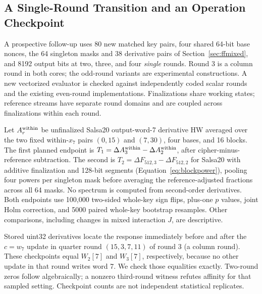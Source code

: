 \subsection{A Single-Round Transition and an Operation Checkpoint}\label{sec:roundtransitionmethods}

A prospective follow-up uses 80 new matched key pairs, four shared 64-bit base nonces, the 64 singleton masks and 38 derivative pairs of Section~\ref{sec:ffmixed}, and 8192 output bits at two, three, and four \emph{single} rounds. Round 3 is a column round in both cores; the odd-round variants are experimental constructions. A new vectorized evaluator is checked against independently coded scalar rounds and the existing even-round implementations. Finalizations share working states; reference streams have separate round domains and are coupled across finalizations within each round.

Let $A^{\rm within}_r$ be unfinalized Salsa20 output-word-7 derivative HW averaged over the two fixed within-$x_7$ pairs $(0,15)$ and $(7,30)$, four bases, and 16 blocks. The first planned endpoint is $T_1=\Delta A^{\rm within}_3-\Delta A^{\rm within}_2$, after cipher-minus-reference subtraction. The second is $T_2=\Delta F_{512,3}-\Delta F_{512,2}$ for Salsa20 with additive finalization and 128-bit segments (Equation~\eqref{eq:blockpower}), pooling four powers per singleton mask before averaging the reference-adjusted fractions across all 64 masks. No spectrum is computed from second-order derivatives. Both endpoints use 100,000 two-sided whole-key sign flips, plus-one $p$ values, joint Holm correction, and 5000 paired whole-key bootstrap resamples. Other comparisons, including changes in mixed interaction $J$, are descriptive.

Stored uint32 derivatives locate the response immediately before and after the $c=w_7$ update in quarter round $(15,3,7,11)$ of round 3 (a column round). These checkpoints equal $W_2[7]$ and $W_3[7]$, respectively, because no other update in that round writes word 7. We check those equalities exactly. Two-round zeros follow algebraically; a nonzero third-round witness refutes affinity for that sampled setting. Checkpoint counts are not independent statistical replicates.
